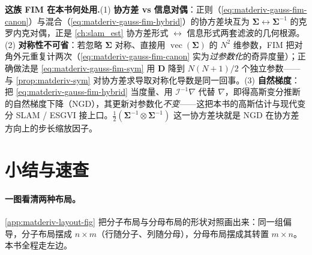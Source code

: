\begin{note}
\textbf{这族 FIM 在本书何处用.}\;(1) \textbf{协方差 vs 信息对偶}：正则（\cref{eq:matderiv-gauss-fim-canon}）与混合（\cref{eq:matderiv-gauss-fim-hybrid}）的协方差块互为 $\boldsymbol{\Sigma}\!\leftrightarrow\!\boldsymbol{\Sigma}^{-1}$ 的克罗内克对偶，正是 \cref{ch:slam_est} 协方差形式 $\leftrightarrow$ 信息形式两套滤波的几何根源。(2) \textbf{对称性不可省}：若忽略 $\boldsymbol{\Sigma}$ 对称、直接用 $\operatorname{vec}(\boldsymbol{\Sigma})$ 的 $N^2$ 维参数，FIM 把对角外元重复计两次（\cref{eq:matderiv-gauss-fim-canon} 实为\emph{过参数化}的奇异度量）；正确做法是 \cref{eq:matderiv-gauss-fim-sym} 用 $\mathbf{D}$ 降到 $N(N{+}1)/2$ 个独立参数——与 \cref{prop:matderiv-sym} 对协方差求导取对称化导数是同一回事。(3) \textbf{自然梯度}：把 \cref{eq:matderiv-gauss-fim-hybrid} 当度量、用 $\boldsymbol{\mathcal{I}}^{-1}\nabla$ 代替 $\nabla$，即得高斯变分推断的自然梯度下降（NGD），其更新对参数化\emph{不变}——这把本书的高斯估计与现代变分 SLAM / ESGVI 接上口\cite{barfoot2024state}。$\tfrac12(\boldsymbol{\Sigma}^{-1}\otimes\boldsymbol{\Sigma}^{-1})$ 这一协方差块就是 NGD 在协方差方向上的步长缩放因子。
\end{note}

\section{小结与速查}
\label{sec:matderiv-summary}

\paragraph{一图看清两种布局。}
\cref{app:matderiv-layout-fig} 把分子布局与分母布局的形状对照画出来：同一组偏导，分子布局摆成 $n\times m$（行随分子、列随分母），分母布局摆成其转置 $m\times n$。本书全程走左边。

